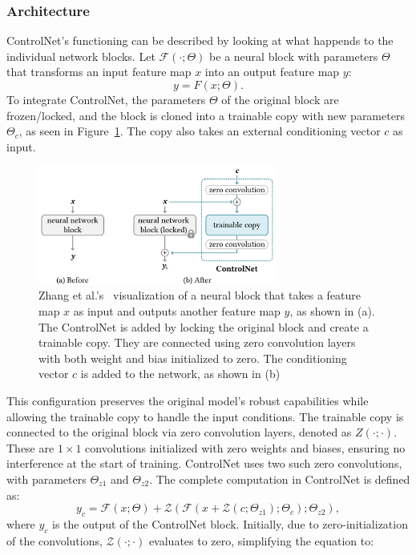 \subsubsection{Architecture}
ControlNet's functioning can be described by looking at what happends to the individual network blocks. Let $\mathcal{F}(\cdot; \Theta)$ be a neural block with parameters $\Theta$ that transforms an input feature map $x$ into an output feature map $y$:
\[
    y = F(x; \Theta).
\]
To integrate ControlNet, the parameters $\Theta$ of the original block are frozen/locked, and the block is cloned into a trainable copy with new parameters $\Theta_c$, as seen in Figure~\ref{fig:control_net:network_blocks}. The copy also takes an external conditioning vector $c$ as input.
\begin{figure}[h!]
    \centering
    \includegraphics[width=0.7\textwidth]{assets/control_net_network_blocks.pdf}
    \caption{Zhang et al.'s~\cite{zhang2023addingconditionalcontroltexttoimage} visualization of a neural block that takes a feature map $x$ as input and outputs another feature map $y$, as shown in (a). The ControlNet is added by locking the original block and create a trainable copy. They are connected using zero convolution layers with both weight and bias initialized to zero. The conditioning vector $c$ is added to the network, as shown in (b)}
    \label{fig:control_net:network_blocks}
\end{figure}
This configuration preserves the original model's robust capabilities while allowing the trainable copy to handle the input conditions. The trainable copy is connected to the original block via zero convolution layers, denoted as $Z(\cdot; \cdot)$. These are $1 \times 1$ convolutions initialized with zero weights and biases, ensuring no interference at the start of training. ControlNet uses two such zero convolutions, with parameters $\Theta_{z1}$ and $\Theta_{z2}$. The complete computation in ControlNet is defined as:
\[
    y_c = \mathcal{F}(x; \Theta) + \mathcal{Z}(\mathcal{F}(x + \mathcal{Z}(c; \Theta_{z1}); \Theta_c); \Theta_{z2}),
\]
where $y_c$ is the output of the ControlNet block. Initially, due to zero-initialization of the convolutions, $\mathcal{Z}(\cdot; \cdot)$ evaluates to zero, simplifying the equation to:
